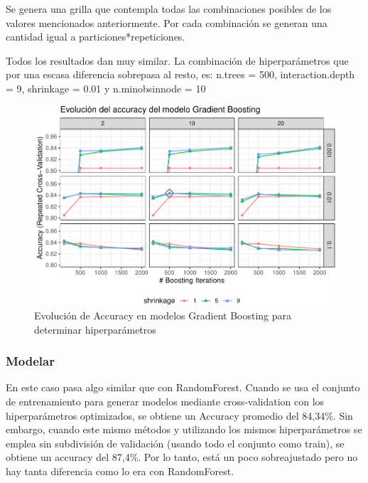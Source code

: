 Se genera una grilla que contempla todas las combinaciones posibles de
los valores mencionados anteriormente. Por cada combinación se generan
una cantidad igual a particiones*repeticiones.

Todos los resultados dan muy similar. La combinación de hiperparámetros
que por una escasa diferencia sobrepasa al resto, es: n.trees = 500,
interaction.depth = 9, shrinkage = 0.01 y n.minobsinnode = 10


\begin{figure}[!htb]
	\centering
	\includegraphics{imagenes/modelos_varios/unnamed-chunk-28-1.pdf}
	\caption{Evolución de Accuracy en modelos Gradient Boosting para determinar hiperparámetros}
	\label{fig:rf_hiperparam}
\end{figure}


\subsubsection{Modelar}

En este caso pasa algo similar que con RandomForest. Cuando se usa el conjunto de entrenamiento para generar modelos mediante cross-validation con los hiperparámetros optimizados, se obtiene un Accuracy promedio del 84,34\%. Sin embargo, cuando este mismo métodos y utilizando los mismos hiperparámetros se emplea sin subdivisión de validación (usando todo el conjunto como train), se obtiene un accuracy del 87,4\%. Por lo tanto, está un poco sobreajustado pero no hay tanta diferencia como lo era con RandomForest.





